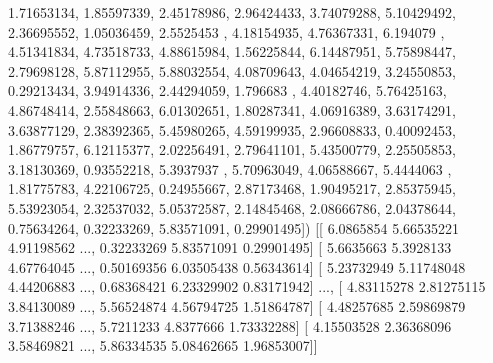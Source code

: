         1.71653134,  1.85597339,  2.45178986,  2.96424433,  3.74079288,
        5.10429492,  2.36695552,  1.05036459,  2.5525453 ,  4.18154935,
        4.76367331,  6.194079  ,  4.51341834,  4.73518733,  4.88615984,
        1.56225844,  6.14487951,  5.75898447,  2.79698128,  5.87112955,
        5.88032554,  4.08709643,  4.04654219,  3.24550853,  0.29213434,
        3.94914336,  2.44294059,  1.796683  ,  4.40182746,  5.76425163,
        4.86748414,  2.55848663,  6.01302651,  1.80287341,  4.06916389,
        3.63174291,  3.63877129,  2.38392365,  5.45980265,  4.59199935,
        2.96608833,  0.40092453,  1.86779757,  6.12115377,  2.02256491,
        2.79641101,  5.43500779,  2.25505853,  3.18130369,  0.93552218,
        5.3937937 ,  5.70963049,  4.06588667,  5.4444063 ,  1.81775783,
        4.22106725,  0.24955667,  2.87173468,  1.90495217,  2.85375945,
        5.53923054,  2.32537032,  5.05372587,  2.14845468,  2.08666786,
        2.04378644,  0.75634264,  0.32233269,  5.83571091,  0.29901495])
[[ 6.0865854   5.66535221  4.91198562 ...,  0.32233269  5.83571091
   0.29901495]
 [ 5.6635663   5.3928133   4.67764045 ...,  0.50169356  6.03505438
   0.56343614]
 [ 5.23732949  5.11748048  4.44206883 ...,  0.68368421  6.23329902
   0.83171942]
 ..., 
 [ 4.83115278  2.81275115  3.84130089 ...,  5.56524874  4.56794725
   1.51864787]
 [ 4.48257685  2.59869879  3.71388246 ...,  5.7211233   4.8377666
   1.73332288]
 [ 4.15503528  2.36368096  3.58469821 ...,  5.86334535  5.08462665
   1.96853007]]